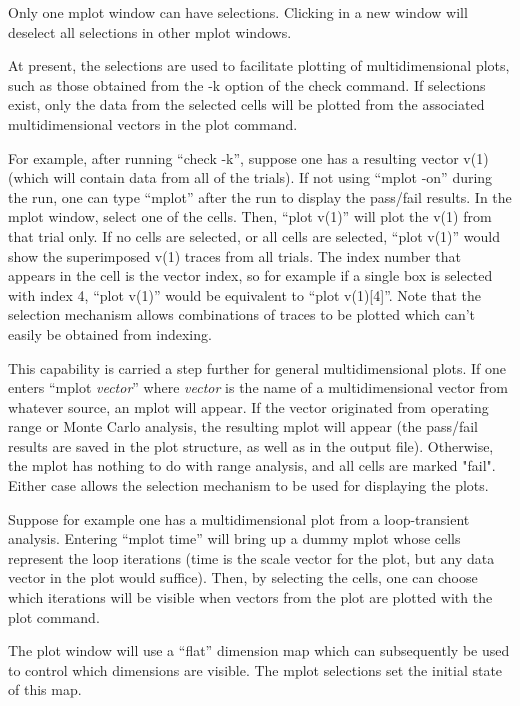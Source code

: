 Only one {\cb mplot} window can have selections.  Clicking in a new
window will deselect all selections in other {\cb mplot} windows.

At present, the selections are used to facilitate plotting of
multidimensional plots, such as those obtained from the {\vt -k}
option of the {\cb check} command.  If selections exist, only the data
from the selected cells will be plotted from the associated
multidimensional vectors in the {\cb plot} command.

For example, after running ``{\vt check -k}'', suppose one has a
resulting vector v(1) (which will contain data from all of the
trials).  If not using ``{\vt mplot -on}'' during the run, one can
type ``{\vt mplot}'' after the run to display the pass/fail results. 
In the {\cb mplot} window, select one of the cells.  Then, ``{\vt plot
v(1)}'' will plot the v(1) from that trial only.  If no cells are
selected, or all cells are selected, ``{\vt plot v(1)}'' would show
the superimposed v(1) traces from all trials.  The index number that
appears in the cell is the vector index, so for example if a single
box is selected with index 4, ``{\vt plot v(1)}'' would be equivalent
to ``{\vt plot v(1)[4]}''.  Note that the selection mechanism allows
combinations of traces to be plotted which can't easily be obtained
from indexing.

This capability is carried a step further for general multidimensional
plots.  If one enters ``{\vt mplot} {\it vector}'' where {\it vector}
is the name of a multidimensional vector from whatever source, an {\cb
mplot} will appear.  If the vector originated from operating range or
Monte Carlo analysis, the resulting {\cb mplot} will appear (the
pass/fail results are saved in the plot structure, as well as in the
output file).  Otherwise, the {\cb mplot} has nothing to do with range
analysis, and all cells are marked "fail".  Either case allows the
selection mechanism to be used for displaying the plots.

Suppose for example one has a multidimensional plot from a
loop-transient analysis.  Entering ``{\vt mplot time}'' will bring up
a dummy {\cb mplot} whose cells represent the loop iterations (time is
the scale vector for the plot, but any data vector in the plot would
suffice).  Then, by selecting the cells, one can choose which
iterations will be visible when vectors from the plot are plotted with
the {\cb plot} command.

The plot window will use a ``flat'' dimension map which can
subsequently be used to control which dimensions are visible.  The
mplot selections set the initial state of this map.


